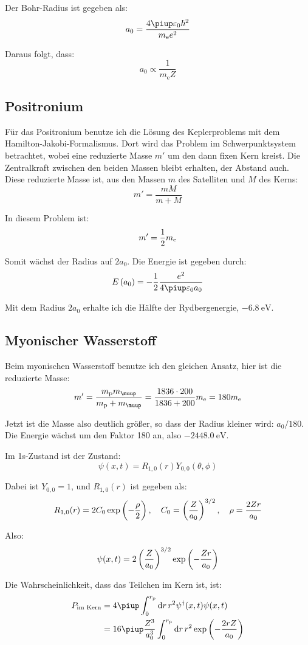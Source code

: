 Der Bohr-Radius ist gegeben als:
\[
	a_0 = \frac{4 \piup \varepsilon_0 \hbar^2}{m_\text e e^2}
\]

Daraus folgt, dass:
\[
	a_0 \propto \frac{1}{m_\text{e} Z}
\]

\subsection{Positronium}

Für das Positronium benutze ich die Lösung des Keplerproblems mit
dem Hamilton-Jakobi-Formalismus. Dort wird das Problem im Schwerpunktsystem
betrachtet, wobei eine reduzierte Masse $m'$ um den dann fixen Kern kreist. Die
Zentralkraft zwischen den beiden Massen bleibt erhalten, der Abstand auch.
Diese reduzierte Masse ist, aus den Massen $m$ des Satelliten und $M$ des
Kerns:
\[
	m' = \frac{m M}{m + M}
\]

In diesem Problem ist:
\[
	m' = \frac 12 m_\text e
\]

Somit wächst der Radius auf $2a_0$. Die Energie ist gegeben durch:
\[
	E\del{a_0} = -\half \frac{e^2}{4\piup\varepsilon_0 a_0}
\]

Mit dem Radius $2a_0$ erhalte ich die Hälfte der Rydbergenergie,
$\SI{-6.8}\electronvolt$.

\subsection{Myonischer Wasserstoff}

Beim myonischen Wasserstoff benutze ich den gleichen Ansatz, hier ist die reduzierte Masse:
\[
	m' = \frac{m_\text p m_\muup}{m_\text p + m_\muup} = \frac{\num{1836} \cdot 200}{\num{1836} + 200} m_\text e
	= 180 m_\text e
\]

Jetzt ist die Masse also deutlich größer, so dass der Radius kleiner wird:
$a_0 / 180$. Die Energie wächst um den Faktor \num{180} an, also
$\SI{-2448.0}\electronvolt$.

Im 1s-Zustand ist der Zustand:
\[
	\psi(x, t) = R_{1,0}(r) Y_{0, 0}(\theta, \phi)
\]

Dabei ist $Y_{0, 0} = 1$, und $R_{1,0}(r)$ ist gegeben als:
\[
	R_{1,0}(r) = 2 C_0 \exp\del{- \frac{\rho}{2}}
	\eqnsep
	C_0 = \del{\frac Z{a_0}}^{3/2}
	\eqnsep
	\rho = \frac{2Zr}{a_0}
\]

Also:
\[
	\psi(x, t) = 2 \del{\frac Z{a_0}}^{3/2} \exp\del{- \frac{Zr}{a_0}}
\]

Die Wahrscheinlichkeit, dass das Teilchen im Kern ist, ist:
\begin{align*}
	P_\text{im Kern}
	&= 4 \piup \int_0^{r_{\text p}} \dif r \, r^2 \psi^\dagger(x, t) \psi(x, t) \\
	&= 16 \piup \frac{Z^3}{a_0^3} \int_0^{r_{\text p}} \dif r \, r^2 \exp\del{- \frac{2rZ}{a_0}}
\end{align*}

